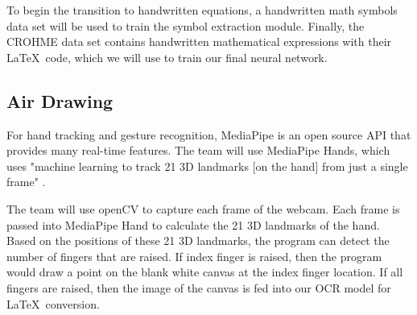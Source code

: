 To begin the transition to handwritten equations, a handwritten math symbols data set will be used to train the symbol extraction module\cite{HandwrittenMath}. Finally, the CROHME data set contains handwritten mathematical expressions with their \LaTeX\ code, which we will use to train our final neural network\cite{CROHME}.

\subsection{Air Drawing}
For hand tracking and gesture recognition, MediaPipe is an open source API that provides many real-time features. The team will use MediaPipe Hands, which uses "machine learning to track 21 3D landmarks [on the hand] from just a single frame" \cite{MP}. 

The team will use openCV to capture each frame of the webcam. Each frame is passed into MediaPipe Hand to calculate the 21 3D landmarks of the hand. Based on the positions of these 21 3D landmarks, the program can detect the number of fingers that are raised. If index finger is raised, then the program would draw a point on the blank white canvas at the index finger location. If all fingers are raised, then the image of the canvas is fed into our OCR model for \LaTeX\ conversion. 


